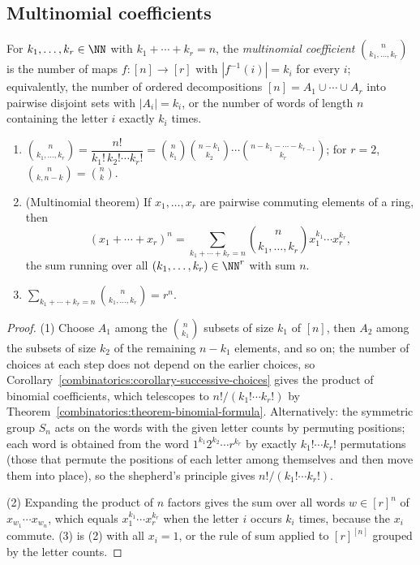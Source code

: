 \subsection{Multinomial coefficients}\label{combinatorics:subsection-multinomial}

\begin{definition}\label{combinatorics:definition-multinomial}
For $k_1, \ldots, k_r \in \NN$ with $k_1 + \cdots + k_r = n$, the \emph{multinomial coefficient} $\binom{n}{k_1, \ldots, k_r}$ is the number of maps $f \colon [n] \to [r]$ with
$|f^{-1}(i)| = k_i$ for every $i$; equivalently, the number of ordered decompositions $[n] = A_1 \cup \cdots \cup A_r$ into pairwise disjoint sets with $|A_i| = k_i$, or the number of words of length
$n$ containing the letter $i$ exactly $k_i$ times.
\end{definition}

\begin{theorem}\label{combinatorics:theorem-multinomial}
\begin{enumerate}
\item $\binom{n}{k_1, \ldots, k_r} = \dfrac{n!}{k_1!\,k_2! \cdots k_r!} = \binom{n}{k_1}\binom{n - k_1}{k_2} \cdots \binom{n - k_1 - \cdots - k_{r-1}}{k_r}$; for $r = 2$,
$\binom{n}{k, n - k} = \binom{n}{k}$.
\item (Multinomial theorem) If $x_1, \ldots, x_r$ are pairwise commuting elements of a ring, then
\[
(x_1 + \cdots + x_r)^n = \sum_{k_1 + \cdots + k_r = n}\binom{n}{k_1, \ldots, k_r}x_1^{k_1} \cdots x_r^{k_r},
\]
the sum running over all $(k_1, \ldots, k_r) \in \NN^r$ with sum $n$.
\item $\sum_{k_1 + \cdots + k_r = n}\binom{n}{k_1, \ldots, k_r} = r^n$.
\end{enumerate}
\end{theorem}

\begin{proof}
(1) Choose $A_1$ among the $\binom{n}{k_1}$ subsets of size $k_1$ of $[n]$, then $A_2$ among the subsets of size $k_2$ of the remaining $n - k_1$ elements, and so on; the number of choices at each step
does not depend on the earlier choices, so Corollary~\ref{combinatorics:corollary-successive-choices} gives the product of binomial coefficients, which telescopes to $n!/(k_1! \cdots k_r!)$ by
Theorem~\ref{combinatorics:theorem-binomial-formula}. Alternatively: the symmetric group $S_n$ acts on the words with the given letter counts by permuting positions; each word is obtained from the
word $1^{k_1}2^{k_2} \cdots r^{k_r}$ by exactly $k_1! \cdots k_r!$ permutations (those that permute the positions of each letter among themselves and then move them into place), so the shepherd's principle
gives $n!/(k_1! \cdots k_r!)$.

(2) Expanding the product of $n$ factors gives the sum over all words $w \in [r]^n$ of $x_{w_1} \cdots x_{w_n}$, which equals $x_1^{k_1} \cdots x_r^{k_r}$ when the letter $i$ occurs $k_i$ times,
because the $x_i$ commute. (3) is (2) with all $x_i = 1$, or the rule of sum applied to $[r]^{[n]}$ grouped by the letter counts.
\end{proof}

